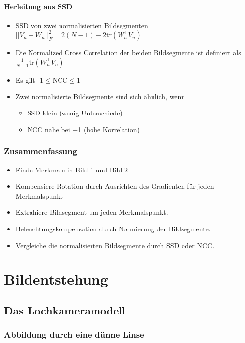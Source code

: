 \documentclass[12pt, a4paper, oneside]{article}
\begin{document}
\paragraph*{Herleitung aus SSD}
\begin{itemize}
  \item SSD von zwei normalisierten Bildsegmenten $||V_n-W_n||_F^2=2(N-1)-2\text{tr}(W_n^\top V_n)$
  \item Die Normalized Cross Correlation der beiden Bildsegmente ist definiert als $\frac{1}{N-1}\text{tr}(W_n^\top V_n)$
  \item Es gilt -1$\le$NCC$\le$1
  \item Zwei normalisierte Bildsegmente sind sich ähnlich, wenn
  \begin{itemize}
      \item SSD klein (wenig Unterschiede)
      \item NCC nahe bei +1 (hohe Korrelation)
  \end{itemize}
\end{itemize}

\subsubsection{Zusammenfassung}

\begin{itemize}
  \item Finde Merkmale in Bild 1 und Bild 2
  \item Kompensiere Rotation durch Ausrichten des Gradienten für jeden Merkmalspunkt
  \item Extrahiere Bildsegment um jeden Merkmalspunkt.
  \item Beleuchtungskompensation durch Normierung der Bildsegmente.
  \item Vergleiche die normalisierten Bildsegmente durch SSD oder NCC.
\end{itemize}

\newpage

\section{Bildentstehung}

\subsection{Das Lochkameramodell}

\subsubsection{Abbildung durch eine dünne Linse}
\end{document}

